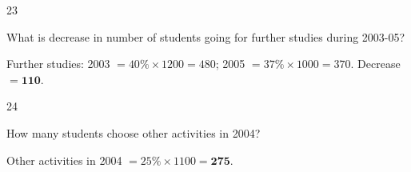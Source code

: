 \begin{question}{23}
{What is decrease in number of students going for further studies during 2003-05?\par}
\begin{explain}
Further studies: 2003 $=40\%\times1200=480$; 2005 $=37\%\times1000=370$. Decrease $=\mathbf{110}$.
\end{explain}
\end{question}

\begin{question}{24}
{How many students choose other activities in 2004?\par}
\begin{explain}
Other activities in 2004 $=25\%\times1100=\mathbf{275}$.
\end{explain}
\end{question}

